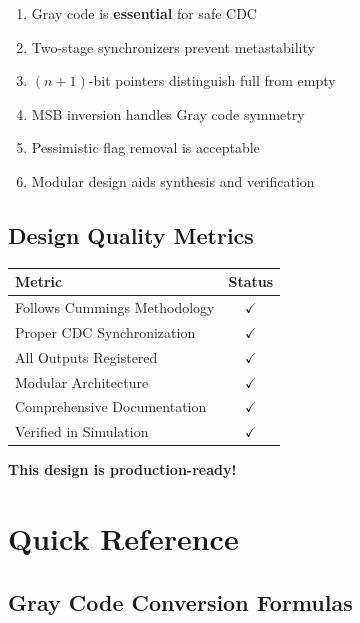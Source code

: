 \documentclass[12pt,a4paper]{article}
\begin{document}
\begin{tcolorbox}[colback=green!5!white,colframe=green!75!black]
\begin{enumerate}
    \item Gray code is \textbf{essential} for safe CDC
    \item Two-stage synchronizers prevent metastability
    \item $(n+1)$-bit pointers distinguish full from empty
    \item MSB inversion handles Gray code symmetry
    \item Pessimistic flag removal is acceptable
    \item Modular design aids synthesis and verification
\end{enumerate}
\end{tcolorbox}

\subsection{Design Quality Metrics}

\begin{table}[h]
\centering
\begin{tabular}{|l|c|}
\hline
\textbf{Metric} & \textbf{Status} \\
\hline
Follows Cummings Methodology & $\checkmark$ \\
Proper CDC Synchronization & $\checkmark$ \\
All Outputs Registered & $\checkmark$ \\
Modular Architecture & $\checkmark$ \\
Comprehensive Documentation & $\checkmark$ \\
Verified in Simulation & $\checkmark$ \\
\hline
\end{tabular}
\end{table}

\textbf{This design is production-ready!}

\appendix

\section{Quick Reference}

\subsection{Gray Code Conversion Formulas}
\end{document}
